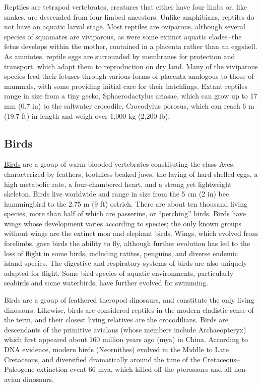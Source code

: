 Reptiles are tetrapod vertebrates, creatures that either have four limbs or, like snakes, are descended from four-limbed ancestors. Unlike amphibians, reptiles do not have an aquatic larval stage. Most reptiles are oviparous, although several species of squamates are viviparous, as were some extinct aquatic clades -- the fetus develops within the mother, contained in a placenta rather than an eggshell. As amniotes, reptile eggs are surrounded by membranes for protection and transport, which adapt them to reproduction on dry land. Many of the viviparous species feed their fetuses through various forms of placenta analogous to those of mammals, with some providing initial care for their hatchlings. Extant reptiles range in size from a tiny gecko, Sphaerodactylus ariasae, which can grow up to 17 mm (0.7 in) to the saltwater crocodile, Crocodylus porosus, which can reach 6 m (19.7 ft) in length and weigh over 1,000 kg (2,200 lb).

\hypertarget{birds}{%
\subsection{Birds}\label{birds}}

\href{https://en.wikipedia.org/wiki/Bird}{Birds} are a group of warm-blooded vertebrates constituting the class Aves, characterized by feathers, toothless beaked jaws, the laying of hard-shelled eggs, a high metabolic rate, a four-chambered heart, and a strong yet lightweight skeleton. Birds live worldwide and range in size from the 5 cm (2 in) bee hummingbird to the 2.75 m (9 ft) ostrich. There are about ten thousand living species, more than half of which are passerine, or ``perching'' birds. Birds have wings whose development varies according to species; the only known groups without wings are the extinct moa and elephant birds. Wings, which evolved from forelimbs, gave birds the ability to fly, although further evolution has led to the loss of flight in some birds, including ratites, penguins, and diverse endemic island species. The digestive and respiratory systems of birds are also uniquely adapted for flight. Some bird species of aquatic environments, particularly seabirds and some waterbirds, have further evolved for swimming.

Birds are a group of feathered theropod dinosaurs, and constitute the only living dinosaurs. Likewise, birds are considered reptiles in the modern cladistic sense of the term, and their closest living relatives are the crocodilians. Birds are descendants of the primitive avialans (whose members include Archaeopteryx) which first appeared about 160 million years ago (mya) in China. According to DNA evidence, modern birds (Neornithes) evolved in the Middle to Late Cretaceous, and diversified dramatically around the time of the Cretaceous--Paleogene extinction event 66 mya, which killed off the pterosaurs and all non-avian dinosaurs.



